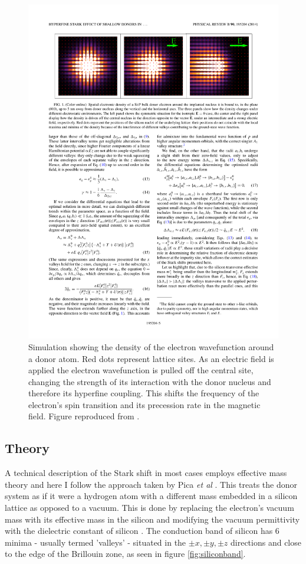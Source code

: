 \begin{figure}
\centering
\includegraphics[width=\textwidth]{Figures/starkShift.pdf}
\caption[Electron wavefunction Stark shift]{Simulation showing the density of the electron wavefunction around a donor atom. Red dots represent lattice sites. As an electric field is applied the electron wavefunction is pulled off the central site, changing the strength of its interaction with the donor nucleus and therefore its hyperfine coupling. This shifts the frequency of the electron's spin transition and its precession rate in the magnetic field. Figure reproduced from \cite{Pica2014}.}
\label{fig:starkShift}
\end{figure}

\subsection{Theory}

A technical description of the Stark shift in most cases employs effective mass theory and here I follow the approach taken by Pica \emph{et al} \cite{Pica2014}.
This treats the donor system as if it were a hydrogen atom with a different mass embedded in a silicon lattice as opposed to a vacuum.
This is done by replacing the electron's vacuum mass with its effective mass in the silicon and modifying the vacuum permittivity with the dielectric constant of silicon \cite{Wolfowicz2015a}.
The conduction band of silicon has 6 minima - usually termed 'valleys' - situated in the $\pm x, \pm y, \pm z$ directions and close to the edge of the Brillouin zone, as seen in figure \ref{fig:siliconband}. 

